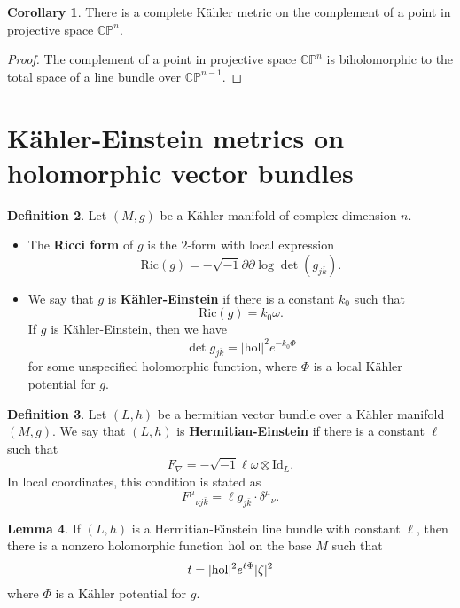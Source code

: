 \documentclass{article}
\numberwithin{equation}{section}
\theoremstyle{definition}
\newtheorem{definition}{Definition}[section]
\theoremstyle{theorem}
\newtheorem{corollary}[definition]{Corollary}
\newtheorem{lemma}[definition]{Lemma}
\newcommand{\ddb}{\partial\bar{\partial}}
\begin{document}
\begin{corollary}
There is a complete K\"ahler metric on the complement of a point in projective space $\mathbb{CP}^n$. 
\end{corollary}

\begin{proof}
The complement of a point in projective space $\mathbb{CP}^n$ is biholomorphic to the total space of a line bundle over $\mathbb{CP}^{n-1}$. 
\end{proof}


\section{K\"ahler-Einstein metrics on holomorphic vector bundles}

\begin{definition}
Let $(M,g)$ be a K\"ahler manifold of complex dimension $n$. 
\begin{itemize}
\item The \textbf{Ricci form} of $g$ is the $2$-form with local expression 
\[
\text{Ric}(g) = - \sqrt{-1} \ddb \log \det (g_{j\bar{k}}).
\]
\item We say that $g$ is \textbf{K\"ahler-Einstein} if there is a constant $k_0$ such that 
\[
\text{Ric}(g) = k_0 \omega.
\]
If $g$ is K\"ahler-Einstein, then we have 
\[
\det g_{j \bar{k}} = |\text{hol}|^2 e^{-k_0 \Phi}
\] 
for some unspecified holomorphic function, where $\Phi$ is a local K\"ahler potential for $g$. 
\end{itemize}
\end{definition}

\begin{definition}
Let $(L,h)$ be a hermitian vector bundle over a K\"ahler manifold $(M,g)$. We say that $(L,h)$ is \textbf{Hermitian-Einstein} if there is a constant $\ell$ such that 
\[
F_\nabla = -\sqrt{-1} \ell \omega \otimes \text{Id}_L. 
\]
In local coordinates, this condition is stated as 
\[
F^{\mu}{}_{\nu j\bar{k}} = \ell g_{j \bar{k}}\cdot \delta^\mu{}_{\nu}.
\]
\end{definition}

\begin{lemma}
If $(L,h)$ is a Hermitian-Einstein line bundle with constant $\ell$, then there is a nonzero holomorphic function $\textnormal{hol}$ on the base $M$ such that 
\[
t = |\textnormal{hol}|^2 e^{\ell \Phi} |\zeta|^2
\]
where $\Phi$ is a K\"ahler potential for $g$. 
\end{lemma}
\end{document}
